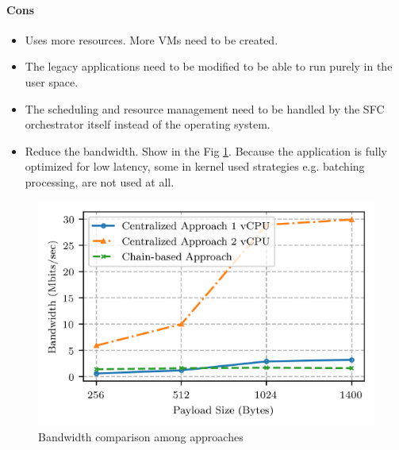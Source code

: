 \documentclass[12pt]{article}
\begin{document}
\paragraph{Cons}
\begin{itemize}
    \item Uses more resources. More VMs need to be created.
    \item The legacy applications need to be modified to be able to run purely in the user space.
    \item The scheduling and resource management need to be handled by the SFC orchestrator itself instead of the
        operating system.
    \item Reduce the bandwidth. Show in the Fig \ref{fig:bandwidth}. Because the application is fully optimized for low
        latency, some in kernel used strategies e.g. batching processing, are not used at all.
\end{itemize}


\begin{figure}[htpb]
    \centering
    \includegraphics[width=1\linewidth]{./figures/bandwidth.pdf}
    \caption{Bandwidth comparison among approaches}
    \label{fig:bandwidth}
\end{figure}
\end{document}
